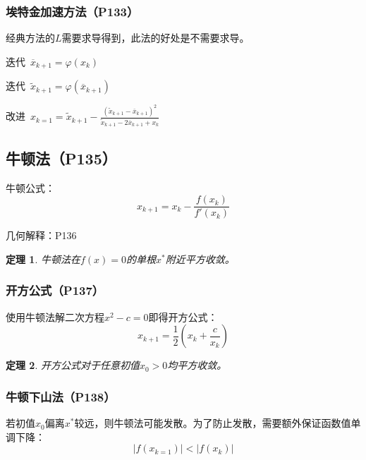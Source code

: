\documentclass[fontset=ubuntu]{ctexart}
\newtheorem{theorem}{定理}
\numberwithin{equation}{section}
\numberwithin{theorem}{section}
\begin{document}
\begin{multicols}{2}
    \subsubsection{埃特金加速方法（P133）}

    经典方法的$L$需要求导得到，此法的好处是不需要求导。

    迭代\ $\overline{x}_{k+1}=\varphi(x_k)$

    迭代\ $\widetilde{x}_{k+1}=\varphi\left(\overline{x}_{k+1} \right )$

    改进\ $x_{k=1}=\widetilde{x}_{k+1}-\frac{(\widetilde{x}_{k+1}-\overline{x}_{k+1})^2}{\widetilde{x}_{k+1}-2\overline{x}_{k+1}+x_k}$

    \subsection{牛顿法（P135）}

    牛顿公式：
    \begin{equation}
        x_{k+1}=x_k-\frac{f(x_k)}{f'(x_k)}
    \end{equation}

    几何解释：P136

    \begin{theorem}
        牛顿法在$f(x)=0$的单根$x^*$附近平方收敛。
    \end{theorem}

    \subsubsection{开方公式（P137）}

    使用牛顿法解二次方程$x^2-c=0$即得开方公式：
    \begin{equation}
        x_{k+1}=\frac{1}{2}\left(x_k+\frac{c}{x_k}\right)
    \end{equation}

    \begin{theorem}
        开方公式对于任意初值$x_0>0$均平方收敛。
    \end{theorem}

    \subsubsection{牛顿下山法（P138）}

    若初值$x_0$偏离$x^*$较远，则牛顿法可能发散。为了防止发散，需要额外保证函数值单调下降：
    \begin{equation}
        \lvert f(x_{k=1})\rvert<\lvert f(x_k)\rvert
    \end{equation}


\end{multicols}
\end{document}
